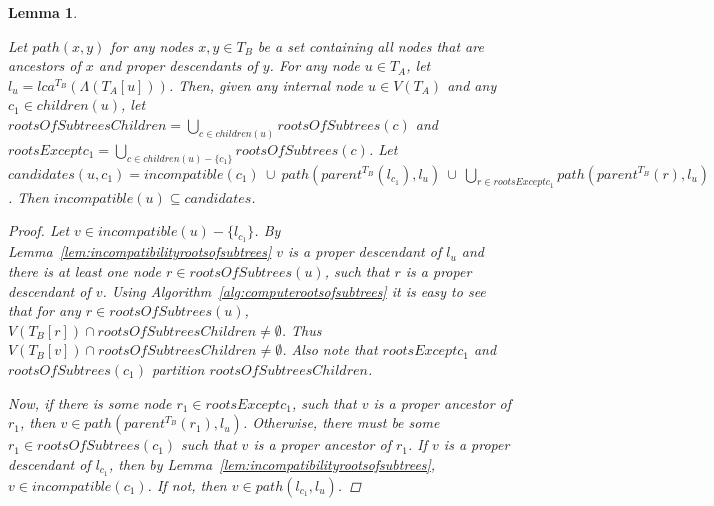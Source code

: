 \documentclass{article}
\newcommand{\leafset}{\Lambda}
\newtheorem{incompatiblecandidates}[incompatibility]{Lemma}
\begin{document}
    \begin{incompatiblecandidates}
        \label{lem:incompatiblecandidates}

        Let $path(x, y)$ for any nodes $x, y \in T_B$ be a set containing all nodes that are ancestors of $x$ and proper descendants of $y$. For any node $u \in T_A$, let $l_u = lca^{T_B}(\leafset(T_A[u]))$. Then, given any internal node $u \in V(T_A)$ and any $c_1 \in children(u)$, let $rootsOfSubtreesChildren = \bigcup_{c \in children(u)} rootsOfSubtrees(c)$ and $rootsExceptc_1 = \bigcup_{c \in children(u) - \{c_1\}} rootsOfSubtrees(c)$. Let $candidates(u, c_1) = incompatible(c_1)\ \cup\ path(parent^{T_B}(l_{c_1}), l_u)\ \cup\ \bigcup_{r \in rootsExceptc_1} path(parent^{T_B}(r), l_u)$. Then $incompatible(u)\subseteq candidates$.

        \begin{proof}
            Let $v \in incompatible(u) - \{l_{c_1}\}$. By Lemma~\ref{lem:incompatibilityrootsofsubtrees} $v$ is a proper descendant of $l_u$ and there is at least one node $r \in rootsOfSubtrees(u)$, such that $r$ is a proper descendant of $v$. Using Algorithm~\ref{alg:computerootsofsubtrees} it is easy to see that for any $r \in rootsOfSubtrees(u)$, $V(T_B[r]) \cap rootsOfSubtreesChildren \neq \emptyset$. Thus $V(T_B[v]) \cap rootsOfSubtreesChildren \neq \emptyset$. Also note that $rootsExceptc_1$ and $rootsOfSubtrees(c_1)$ partition $rootsOfSubtreesChildren$.

            Now, if there is some node $r_1 \in rootsExceptc_1$, such that $v$ is a proper ancestor of $r_1$, then $v \in path(parent^{T_B}(r_1), l_u)$. Otherwise, there must be some $r_1 \in rootsOfSubtrees(c_1)$ such that $v$ is a proper ancestor of $r_1$. If $v$ is a proper descendant of $l_{c_1}$, then by Lemma~\ref{lem:incompatibilityrootsofsubtrees}, $v \in incompatible(c_1)$. If not, then $v \in path(l_{c_1}, l_u)$.
        \end{proof}
    \end{incompatiblecandidates}
\end{document}
